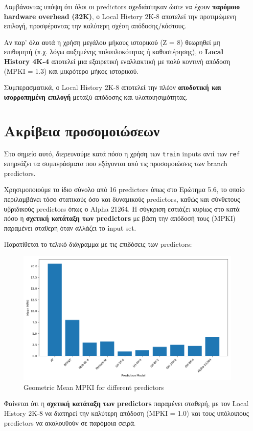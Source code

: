\documentclass{article}
\begin{document}
Λαμβάνοντας υπόψη ότι όλοι οι predictors σχεδιάστηκαν ώστε να έχουν \textbf{παρόμοιο hardware overhead (32Κ)}, ο Local History 2K-8 αποτελεί την προτιμώμενη επιλογή, προσφέροντας την καλύτερη σχέση απόδοσης/κόστους. 

Αν παρ' όλα αυτά η χρήση μεγάλου μήκους ιστορικού (Ζ = 8) θεωρηθεί μη επιθυμητή (π.χ. λόγω αυξημένης πολυπλοκότητας ή καθυστέρησης), ο \textbf{Local History 4K-4} αποτελεί μια εξαιρετική εναλλακτική με πολύ κοντινή απόδοση (MPKI = 1.3) και μικρότερο μήκος ιστορικού.

\bigskip
Συμπερασματικά, ο Local History 2K-8 αποτελεί την πλέον \textbf{αποδοτική και ισορροπημένη επιλογή} μεταξύ απόδοσης και υλοποιησιμότητας.

\section{Ακρίβεια προσομοιώσεων}

Στο σημείο αυτό, διερευνούμε κατά πόσο η χρήση των \texttt{train} inputs αντί των \texttt{ref} επηρεάζει τα συμπεράσματα που εξάγονται από τις προσομοιώσεις των branch predictors.

Χρησιμοποιούμε το ίδιο σύνολο από 16 predictors όπως στο Ερώτημα 5.6, το οποίο περιλαμβάνει τόσο στατικούς όσο και δυναμικούς predictors, καθώς και σύνθετους υβριδικούς predictors όπως ο Alpha 21264. Η σύγκριση εστιάζει κυρίως στο κατά πόσο η \textbf{σχετική κατάταξη των predictors} με βάση την απόδοσή τους (MPKI) παραμένει σταθερή όταν αλλάζει το input set.

Παρατίθεται το τελικό διάγραμμα με τις επιδόσεις των predictors:

\begin{figure}[H]
    \centering
    \includegraphics[width=1\textwidth]{figures/5_6/geom_mean.png}
    \caption{Geometric Mean MPKI for different predictors}
    \label{fig:train_dataset_predictors}
\end{figure}

Φαίνεται ότι η \textbf{σχετική κατάταξη των predictors} παραμένει σταθερή, με τον Local History 2K-8 να διατηρεί την καλύτερη απόδοση (MPKI = 1.0) και τους υπόλοιπους predictors να ακολουθούν σε παρόμοια σειρά.
\end{document}
